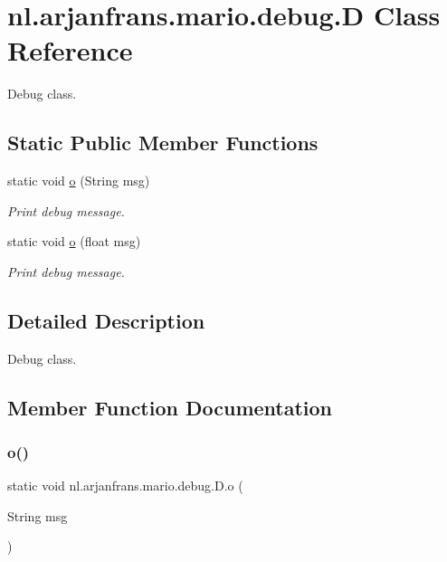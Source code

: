 \hypertarget{classnl_1_1arjanfrans_1_1mario_1_1debug_1_1D}{}\section{nl.\+arjanfrans.\+mario.\+debug.\+D Class Reference}
\label{classnl_1_1arjanfrans_1_1mario_1_1debug_1_1D}


Debug class.  


\subsection*{Static Public Member Functions}
\begin{DoxyCompactItemize}
\item 
static void \hyperlink{classnl_1_1arjanfrans_1_1mario_1_1debug_1_1D_a5b0a7c7830cdd12a95818ad5c114ed3c}{o} (String msg)
\begin{DoxyCompactList}\small\item\em Print debug message. \end{DoxyCompactList}\item 
static void \hyperlink{classnl_1_1arjanfrans_1_1mario_1_1debug_1_1D_aa2b3bc37c1340bc9978ab30a3970e26e}{o} (float msg)
\begin{DoxyCompactList}\small\item\em Print debug message. \end{DoxyCompactList}\end{DoxyCompactItemize}


\subsection{Detailed Description}
Debug class. 

\subsection{Member Function Documentation}
\mbox{\label{classnl_1_1arjanfrans_1_1mario_1_1debug_1_1D_a5b0a7c7830cdd12a95818ad5c114ed3c}} 
\subsubsection{\texorpdfstring{o()}{o()}\hspace{0.1cm}{\footnotesize\ttfamily [1/2]}}
{\footnotesize\ttfamily static void nl.\+arjanfrans.\+mario.\+debug.\+D.\+o (\begin{DoxyParamCaption}\item[{String}]{msg }\end{DoxyParamCaption})\hspace{0.3cm}{\ttfamily [static]}}




